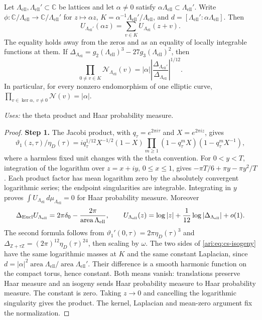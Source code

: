 \begin{proposition}\label{ari:C.1.1}
Let $\Lambda_{\mathrm{ell}},\Lambda_{\mathrm{ell}}'\subset\mathbb C$ be lattices and let
$\alpha\ne0$ satisfy $\alpha\Lambda_{\mathrm{ell}}\subset\Lambda_{\mathrm{ell}}'$. Write
$\phi:\mathbb C/\Lambda_{\mathrm{ell}}\to\mathbb C/\Lambda_{\mathrm{ell}}'$ for $z\mapsto\alpha z$,
$K=\alpha^{-1}\Lambda_{\mathrm{ell}}'/\Lambda_{\mathrm{ell}}$, and
$d=[\Lambda_{\mathrm{ell}}':\alpha\Lambda_{\mathrm{ell}}]$. Then
\begin{equation}\label{ari:eq:cs-isogeny}
 U_{\Lambda_{\mathrm{ell}}'}(\alpha z)=\sum_{v\in K}U_{\Lambda_{\mathrm{ell}}}(z+v).
\end{equation}
The equality holds away from the zeros and as an equality of locally
integrable functions at them. If $\Delta_{\Lambda_{\mathrm{ell}}}=g_2(\Lambda_{\mathrm{ell}})^3-
27g_3(\Lambda_{\mathrm{ell}})^2$, then
\[
 \prod_{0\ne v\in K}\mathcal N_{\Lambda_{\mathrm{ell}}}(v)
 =|\alpha|\left|\frac{\Delta_{\Lambda_{\mathrm{ell}}'}}{\Delta_{\Lambda_{\mathrm{ell}}}}\right|^{1/12}.
\]
In particular, for every nonzero endomorphism of one elliptic curve,
$\prod_{v\in\ker\alpha,\ v\ne0}\mathcal N(v)=|\alpha|$.
\end{proposition}
\noindent\textit{Uses:} the theta product and Haar probability measure.\par
\begin{proof}
\noindent\textbf{Step 1.} The Jacobi product, with $q_\tau=e^{2\pi i\tau}$ and
$X=e^{2\pi iz}$, gives
\[
 \vartheta _1(z,\tau)/\eta_D(\tau)
 =i q_\tau^{1/12}X^{-1/2}(1-X)
     \prod_{m\ge1}(1-q_\tau^mX)(1-q_\tau^mX^{-1}),
\]
where a harmless fixed unit changes with the theta convention. For
$0<y<T$, integration of the logarithm over $z=x+iy$, $0\le x\le1$,
gives $-\pi T/6+\pi y-\pi y^2/T$. Each product factor has mean logarithm
zero by the absolutely convergent logarithmic series; the endpoint
singularities are integrable. Integrating in $y$ proves
$\int U_{\Lambda_{\mathrm{ell}}}\,d\mu_{\Lambda_{\mathrm{ell}}}=0$ for Haar probability measure.
Moreover
\[
 \Delta_{\rm Eucl}U_{\Lambda_{\mathrm{ell}}}
   =2\pi\delta_0-\frac{2\pi}{\operatorname{area}\Lambda_{\mathrm{ell}}},\qquad
 U_{\Lambda_{\mathrm{ell}}}(z)=\log|z|+\frac1{12}\log|\Delta_{\Lambda_{\mathrm{ell}}}|+o(1).
\]
The second formula follows from
$\vartheta _1'(0,\tau)=2\pi\eta_D(\tau)^3$ and
$\Delta_{\mathbb Z+\tau\mathbb Z}=(2\pi)^{12}\eta_D(\tau)^{24}$,
then scaling by $\omega$. The two sides of
\eqref{ari:eq:cs-isogeny} have the same logarithmic masses at $K$ and the
same constant Laplacian, since
$d=|\alpha|^2\operatorname{area}\Lambda_{\mathrm{ell}}/
\operatorname{area}\Lambda_{\mathrm{ell}}'$. Their difference is a smooth harmonic
function on the compact torus, hence constant. Both means vanish:
translations preserve Haar measure and an isogeny sends Haar
probability measure to Haar probability measure. The constant is zero.
Taking $z\to0$ and cancelling the logarithmic singularity gives the
product. The kernel, Laplacian and mean-zero argument fix the normalization.
\end{proof}


